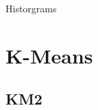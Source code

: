 \documentclass[11pt]{beamer}
\begin{document}
\begin{frame}{Historgrams}
\begin{center}
\end{center}
\end{frame}


\section{K-Means}
\subsection{KM2}
\end{document}
